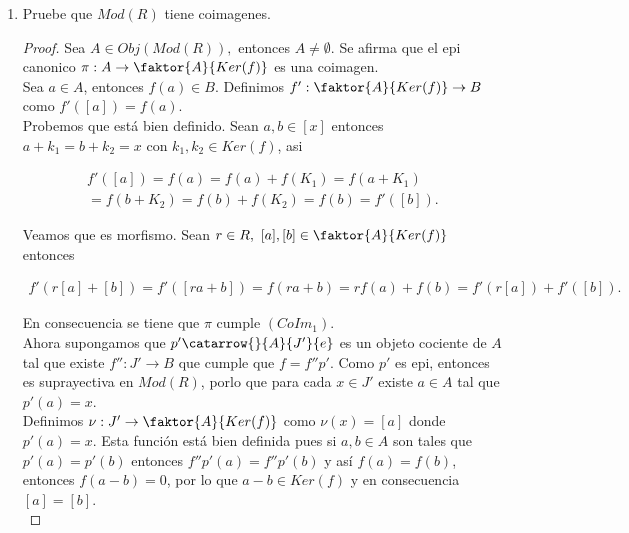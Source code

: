 \documentclass{article}
\begin{document}
\begin{enumerate}[label=\textbf{Ej \arabic*.}]
\begin{proof}
En caso de que $A$ sea el conjunto vacio y $B$ sea distinto del vacio, entonces $(CoIm_1)$ se cumple igual que en el caso anterior, tomando a 
$p: \emptyset\to  \emptyset$.\\

Para probar $(CoIm_2)$ supongamos que $p'\catarrow{}{A}{J'}{e}$ es un objeto cociente de $A$ tal que $exists f'':J'\to B$ tal que $f=f''p'$, pero
$p'$ es epi, y como $A=\emptyset$ entonces $J'=\emptyset$. Así, si definimos $u$ como la identidad en el vacio se tiene que $p=up'$.

\end{proof}

\item Pruebe que $Mod(R)$ tiene coimagenes.\\

\begin{proof}
Sea $A\in Obj(Mod(R)),$ entonces  $A\neq \emptyset$. Se afirma que el epi canonico $\pi:A\to \faktor{A}{Ker(f)}$ es una coimagen.\\

Sea $a\in A$, entonces $f(a)\in B$. Definimos $f': \faktor{A}{Ker(f)}\to B$ como $f'([a])=f(a)$.\\

Probemos que está bien definido. Sean $a,b\in [x]$ entonces \\$a+k_1=b+k_2=x$ con $k_1, k_2\in Ker(f)$, asi

\begin{align*}
f'([a])=f(a)=f(a)+f(K_1)=f(a+K_1)\\
=f(b+K_2)=f(b)+f(K_2)=f(b)=f'([b]).
\end{align*}

Veamos que es morfismo. Sean $r\in R,\,\,[a],[b]\in  \faktor{A}{Ker(f)}$ entonces 

\begin{align*}
f'(r[a]+[b])=f'([ra+b])=f(ra+b)=rf(a)+f(b)=f'(r[a])+f'([b]).
\end{align*}

En consecuencia se tiene que $\pi$ cumple $(CoIm_1)$.\\

Ahora supongamos que $p'\catarrow{}{A}{J'}{e}$ es un objeto cociente de $A$ tal que existe $f'':J'\to B$ que cumple que $f=f''p'$. Como $p'$ es
epi, entonces es suprayectiva en $Mod(R)$, porlo que para cada $x\in J'$ existe $a\in A$ tal que $p'(a)=x$.\\

Definimos $\nu:J'\to \faktor{A}{Ker(f)}$ como $\nu(x)=[a]$ donde $p'(a)=x$. Esta función está bien definida pues si $a,b\in A$ son tales que 
$p'(a)=p'(b)$ entonces $f''p'(a)=f''p'(b)$ y así $f(a)=f(b)$, entonces $f(a-b)=0$, por lo que $a-b\in Ker(f)$ y en consecuencia $[a]=[b]$.\\


\end{proof}
\end{enumerate}
\end{document}
